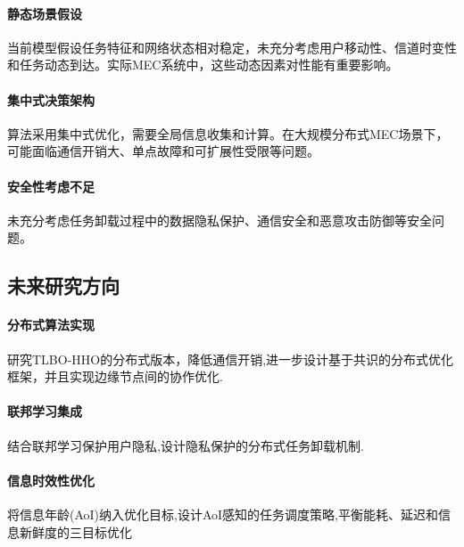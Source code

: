 \documentclass[conference]{IEEEtran}
\begin{document}
\paragraph{静态场景假设}当前模型假设任务特征和网络状态相对稳定，未充分考虑用户移动性、信道时变性和任务动态到达。实际MEC系统中，这些动态因素对性能有重要影响。
\paragraph{集中式决策架构}算法采用集中式优化，需要全局信息收集和计算。在大规模分布式MEC场景下，可能面临通信开销大、单点故障和可扩展性受限等问题。
\paragraph{安全性考虑不足}未充分考虑任务卸载过程中的数据隐私保护、通信安全和恶意攻击防御等安全问题。
\subsection{未来研究方向}
\paragraph{分布式算法实现}研究TLBO-HHO的分布式版本，降低通信开销,进一步设计基于共识的分布式优化框架，并且实现边缘节点间的协作优化.
\paragraph{联邦学习集成}结合联邦学习保护用户隐私,设计隐私保护的分布式任务卸载机制.
\paragraph{信息时效性优化}将信息年龄(AoI)纳入优化目标,设计AoI感知的任务调度策略,平衡能耗、延迟和信息新鲜度的三目标优化
\end{document}
